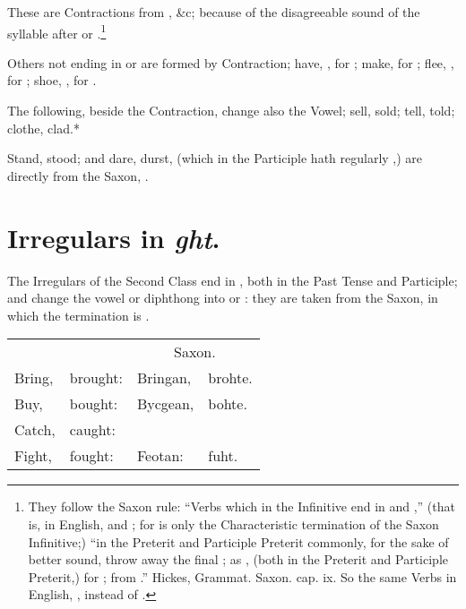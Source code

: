These are Contractions from , \&c; because
of the disagreeable sound of the syllable  after  or
.\footnote{They follow the Saxon rule: ``Verbs which in the
  Infinitive end in  and ,'' (that is, in English,
   and ; for  is only the Characteristic termination
  of the Saxon Infinitive;) ``in the Preterit and Participle Preterit
  commonly, for the sake of better sound, throw away the final ;
  as , (both in the Preterit and Participle Preterit,)
  for ; from .'' Hickes, Grammat.
  Saxon. cap. ix. So the same Verbs in English, , instead
  of .}

Others not ending in  or  are formed by Contraction; have,
, for ; make,  for ; flee,
, for ; shoe, , for .

The following, beside the Contraction, change also the Vowel; sell,
sold; tell, told; clothe, clad.*

Stand, stood; and dare, durst, (which in the Participle hath regularly
,) are directly from the Saxon, .

\section{Irregulars in \emph{ght}.}

The Irregulars of the Second Class end in , both in the Past
Tense and Participle; and change the vowel or diphthong into  or
: they are taken from the Saxon, in which the termination is
.

\begin{tabular}[h]{llll}
  & & \multicolumn{2}{c}{Saxon.}\\
  Bring, & brought: & Bringan, & brohte.\\
  Buy, & bought: & Bycgean, & bohte.\\
  Catch, & caught:\\
  Fight, & fought:\footnotemark & Feotan: & fuht.\\
\end{tabular}


